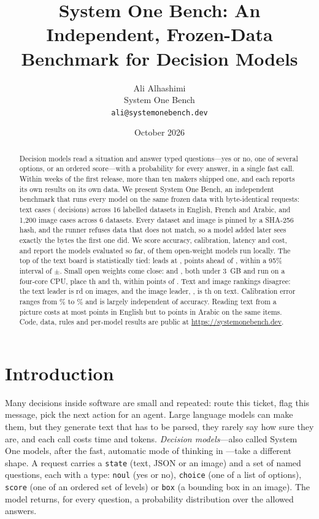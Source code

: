\documentclass[11pt]{article}
\title{System One Bench: An Independent, Frozen-Data Benchmark for Decision Models}
\author{Ali Alhashimi\\ System One Bench\\ \texttt{ali@systemonebench.dev}}
\date{October 2026}
\begin{document}
\maketitle

\begin{abstract}
Decision models read a situation and answer typed questions---yes or no, one of several options, or an ordered
score---with a probability for every answer, in a single fast call. Within weeks of the first release, more than ten
makers shipped one, and each reports its own results on its own data. We present System One Bench, an independent
benchmark that runs every model on the same frozen data with byte-identical requests: \nCases{} text cases
(\nDecisions{} decisions) across 16 labelled datasets in English, French and Arabic, and 1{,}200 image cases across
6 datasets. Every dataset and image is pinned by a SHA-256 hash, and the runner refuses data that does not match, so
a model added later sees exactly the bytes the first one did. We score accuracy, calibration, latency and cost, and
report the \nModels{} models evaluated so far, \nLocal{} of them open-weight models run locally. The top of the text
board is statistically tied: \topText{} leads at \topTextIdx{}, \topTextGap{} points ahead of \secondText{}, within a
95\% interval of $\pm$\topTextCI{}. Small open weights come close: \localA{} and \localB{}, both under 3~GB and run on
a four-core CPU, place \localARank{}th and \localBRank{}th, within \aboveLocalGap{} points of \aboveLocal{}. Text and
image rankings disagree: the text leader is \topTextVisionRank{}rd on images, and the image leader, \topVision{}, is
\topVisionTextRank{}th on text. Calibration error ranges from \eceMin{}\% to \eceMax{}\% and is largely independent
of accuracy. Reading text from a picture costs at most \enGapWorst{} points in English but \arGapBest{} to
\arGapWorst{} points in Arabic on the same items. Code, data, rules and per-model results are public at
\url{https://systemonebench.dev}.
\end{abstract}

\section{Introduction}

Many decisions inside software are small and repeated: route this ticket, flag this message, pick the next action
for an agent. Large language models can make them, but they generate text that has to be parsed, they rarely say how
sure they are, and each call costs time and tokens. \emph{Decision models}---also called System One models, after
the fast, automatic mode of thinking in \citet{kahneman2011thinking}---take a different shape. A request carries a
\texttt{state} (text, JSON or an image) and a set of named questions, each with a type: \texttt{noul} (yes or no),
\texttt{choice} (one of a list of options), \texttt{score} (one of an ordered set of levels) or \texttt{box} (a
bounding box in an image). The model returns, for every question, a probability distribution over the allowed
answers.
\end{document}
